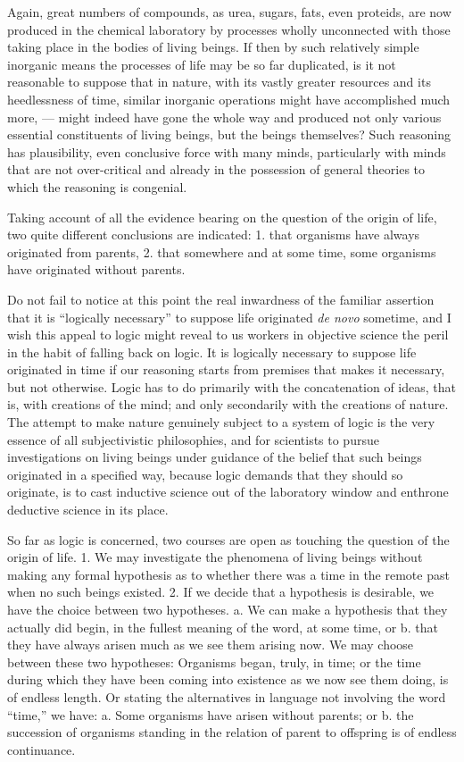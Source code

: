 \documentclass[a4paper, 11pt, oneside, polutonikogreek, english, landscape]{article}
\begin{document}
Again, great numbers of compounds, as urea, sugars, fats, even proteids, are now produced in the chemical laboratory by processes wholly unconnected with those taking place in the bodies of living beings. If then by such relatively simple inorganic means the processes of life may be so far duplicated, is it not reasonable to suppose that in nature, with its vastly greater resources and its heedlessness of time, similar inorganic operations might have accomplished much more, --- might indeed have gone the whole way and produced not only various essential constituents of living beings, but the beings themselves? Such reasoning has plausibility, even conclusive force with many minds, particularly with minds that are not over-critical and already in the possession of general theories to which the reasoning is congenial.

Taking account of all the evidence bearing on the question of the origin of life, two quite different conclusions are indicated: 1. that organisms have always originated from parents, 2. that somewhere and at some time, some organisms have originated without parents.

Do not fail to notice at this point the real inwardness of the familiar assertion that it is ``logically necessary'' to suppose life originated \emph{de novo} sometime, and I wish this appeal to logic might reveal to us workers in objective science the peril in the habit of falling back on logic. It is logically necessary to suppose life originated in time if our reasoning starts from premises that makes it necessary, but not otherwise. Logic has to do primarily with the concatenation of ideas, that is, with creations of the mind; and only secondarily with the creations of nature. The attempt to make nature genuinely subject to a system of logic is the very essence of all subjectivistic philosophies, and for scientists to pursue investigations on living beings under guidance of the belief that such beings originated in a specified way, because logic demands that they should so originate, is to cast inductive science out of the laboratory window and enthrone deductive science in its place.

So far as logic is concerned, two courses are open as touching the question of the origin of life. 1. We may investigate the phenomena of living beings without making any formal hypothesis as to whether there was a time in the remote past when no such beings existed. 2. If we decide that a hypothesis is desirable, we have the choice between two hypotheses. a. We can make a hypothesis that they actually did begin, in the fullest meaning of the word, at some time, or b. that they have always arisen much as we see them arising now. We may choose between these two hypotheses: Organisms began, truly, in time; or the time during which they have been coming into existence as we now see them doing, is of endless length. Or stating the alternatives in language not involving the word ``time,'' we have: a. Some organisms have arisen without parents; or b. the succession of organisms standing in the relation of parent to offspring is of endless continuance.
\end{document}
